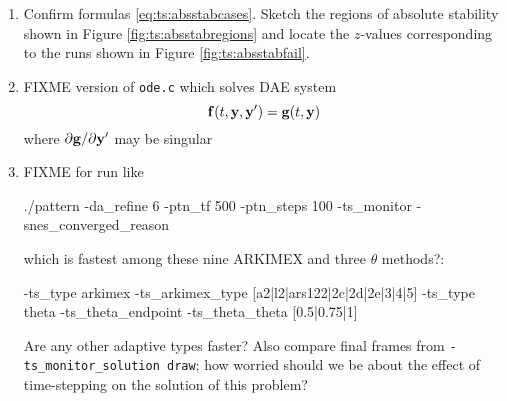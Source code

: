 \begin{enumerate}
\item \label{exer:ts:absstabcases}  Confirm formulas \eqref{eq:ts:absstabcases}.  Sketch the regions of absolute stability shown in Figure \ref{fig:ts:absstabregions} and locate the $z$-values corresponding to the runs shown in Figure \ref{fig:ts:absstabfail}.

\item FIXME version of \texttt{ode.c} which solves DAE system
    $$\mathbf{f}(t,\mathbf{y},\mathbf{y}') = \mathbf{g}(t,\mathbf{y})$$
where $\partial \mathbf{g}/\partial \mathbf{y}'$ may be singular

\item FIXME for run like
\begin{cline}
./pattern -da_refine 6 -ptn_tf 500 -ptn_steps 100 -ts_monitor -snes_converged_reason
\end{cline}
which is fastest among these nine ARKIMEX and three $\theta$ methods?:
\begin{code}
-ts_type arkimex -ts_arkimex_type [a2|l2|ars122|2c|2d|2e|3|4|5]
-ts_type theta -ts_theta_endpoint -ts_theta_theta [0.5|0.75|1]
\end{code}
Are any other adaptive \pTS types faster?  Also compare final frames from \texttt{-ts\_monitor\_solution draw}; how worried should we be about the effect of time-stepping on the solution of this problem?
\end{enumerate}

